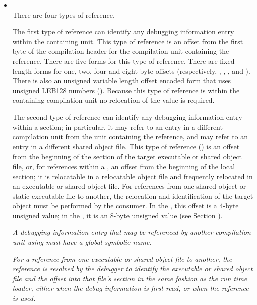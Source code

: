 \begin{itemize}
\item {} \\
There are four types of reference.

The 
first type of reference can identify any debugging
information entry within the containing unit. 
This type of
reference is an 
offset from the first byte of the compilation
header for the compilation unit containing the reference. There
are five forms for this type of reference. There are fixed
length forms for one, two, four and eight byte offsets
(respectively,
\DWFORMrefnMARK 
\DWFORMrefoneTARG, 
\DWFORMreftwoTARG, 
\DWFORMreffourTARG,
and \DWFORMrefeightTARG). 
There is also an unsigned variable
length offset encoded form that uses 
unsigned LEB128 numbers
(\DWFORMrefudataTARG). 
Because this type of reference is within
the containing compilation unit no relocation of the value
is required.

The second type of reference can identify any debugging
information entry within a 
\dotdebuginfo{} section; in particular,
it may refer to an entry in a different compilation unit
from the unit containing the reference, and may refer to an
entry in a different shared object file.  This type of reference
(\DWFORMrefaddrTARG) 
is an offset from the beginning of the
\dotdebuginfo{} 
section of the target executable or shared object file, or, for
references within a , 
an offset from the beginning of the local \dotdebuginfo{} section;
it is relocatable in a relocatable object file and frequently
relocated in an executable or shared object file. For
references from one shared object or static executable file
to another, the relocation and identification of the target
object must be performed by the consumer. In the 
\thirtytwobitdwarfformat, this offset is a 4-byte unsigned value; 
in the \sixtyfourbitdwarfformat, it is an 8-byte
unsigned value 
(see Section ).

\textit{A debugging information entry that may be referenced by
another compilation unit using 
\DWFORMrefaddr{} must have a global symbolic name.}

\textit{For a reference from one executable or shared object file to
another, the reference is resolved by the debugger to identify
the executable or shared object file and the offset into that
file\textquoteright s \dotdebuginfo{}
section in the same fashion as the run
time loader, either when the debug information is first read,
or when the reference is used.}


\end{itemize}
